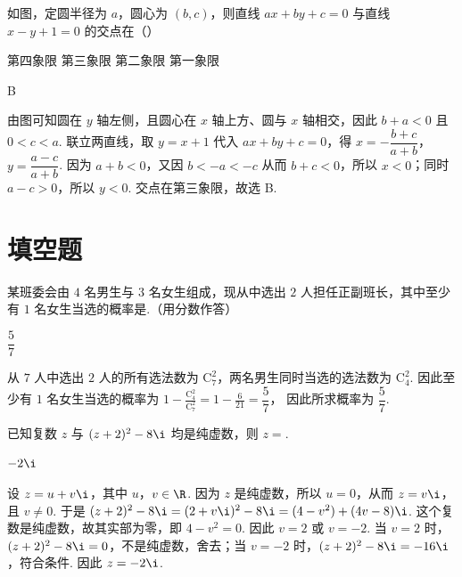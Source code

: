 \begin{problem}
如图，定圆半径为 \(a\)，圆心为 \((b, c)\)，则直线 \(ax + by + c = 0\) 与直线 \(x - y + 1 = 0\) 的交点在（\quad）

\choices
    {第四象限}
    {第三象限}
    {第二象限}
    {第一象限}
\end{problem}

\begin{answer}
B
\end{answer}

\begin{solution}
由图可知圆在 \(y\) 轴左侧，且圆心在 \(x\) 轴上方、圆与 \(x\) 轴相交，因此 \(b+a<0\) 且 \(0<c<a\). 联立两直线，取 \(y=x+1\) 代入 \(ax+by+c=0\)，得
\(x=-\dfrac{b+c}{a+b}\)，\(y=\dfrac{a-c}{a+b}\). 因为 \(a+b<0\)，又因 \(b<-a<-c\) 从而 \(b+c<0\)，所以 \(x<0\)；同时 \(a-c>0\)，所以 \(y<0\). 交点在第三象限，故选 B.
\end{solution}

\section{填空题}
\begin{problem}
某班委会由 \(4\) 名男生与 \(3\) 名女生组成，现从中选出 \(2\) 人担任正副班长，其中至少有 \(1\) 名女生当选的概率是\fillinblank{}.（用分数作答）
\end{problem}

\begin{answer}
\(\dfrac{5}{7}\)
\end{answer}

\begin{solution}
从 \(7\) 人中选出 \(2\) 人的所有选法数为 \(\mathrm C_7^2\)，两名男生同时当选的选法数为 \(\mathrm C_4^2\). 因此至少有 \(1\) 名女生当选的概率为
\(1-\frac{\mathrm C_4^2}{\mathrm C_7^2}=1-\frac{6}{21}=\dfrac{5}{7}\)，
因此所求概率为 \(\dfrac{5}{7}\).
\end{solution}

\begin{problem}
已知复数 \(z\) 与 \((z + 2)^{2} - 8\i\) 均是纯虚数，则 \(z =\)\fillinblank{}.
\end{problem}

\begin{answer}
\(-2\i\)
\end{answer}

\begin{solution}
设 \(z=u+v\i\)，其中 \(u\)，\(v\in\R\). 因为 \(z\) 是纯虚数，所以 \(u=0\)，从而 \(z=v\i\)，且 \(v\ne0\). 于是
\((z+2)^2-8\i=(2+v\i)^2-8\i=(4-v^2)+(4v-8)\i\).
这个复数是纯虚数，故其实部为零，即
\(4-v^2=0\).
因此 \(v=2\) 或 \(v=-2\). 当 \(v=2\) 时，\((z+2)^2-8\i=0\)，不是纯虚数，舍去；当 \(v=-2\) 时，\((z+2)^2-8\i=-16\i\)，符合条件. 因此
\(z=-2\i\).
\end{solution}

